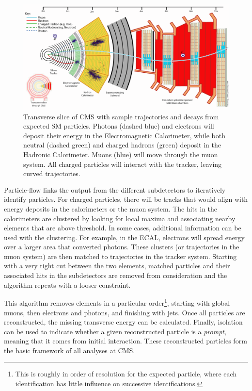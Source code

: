 \begin{figure}[htbp]
\begin{center}
\includegraphics[width=.9\linewidth]{Experiment/figures/CMSSliceWithTracks.png}
\caption[Trajectories and Decays for Particle Identification in CMS]{Transverse slice of CMS with sample trajectories and decays from expected SM particles. Photons (dashed blue) and electrons will deposit their energy in the Electromagnetic Calorimeter, while both neutral (dashed green) and charged hadrons (green) deposit in the Hadronic Calorimeter. Muons (blue) will move through the muon system. All charged particles will interact with the tracker, leaving curved trajectories.}
\label{fig:CMSSliceWithTracks}
\end{center}
\end{figure}

Particle-flow links the output from the different subdetectors to iteratively identify particles. For charged particles, there will be tracks that would align with energy deposits in the calorimeters or the muon system. The hits in the calorimeters are clustered by looking for local maxima and associating nearby elements that are above threshold. In some cases, additional information can be used with the clustering. For example, in the ECAL, electrons will spread energy over a larger area that converted photons. These clusters (or trajectories in the muon system) are then matched to trajectories in the tracker system. Starting with a very tight cut between the two elements, matched particles and their associated hits in the subdetectors are removed from consideration and the algorithm repeats with a looser constraint.

This algorithm removes elements in a particular order\footnote{This is roughly in order of resolution for the expected particle, where each identification has little influence on successive identifications.}, starting with global muons, then electrons and photons, and finishing with jets. Once all particles are reconstructed, the missing transverse energy can be calculated. Finally, isolation can be used to indicate whether a given reconstructed particle is a \textit{prompt}, meaning that it comes from initial interaction. These reconstructed particles form the basic framework of all analyses at CMS. 

